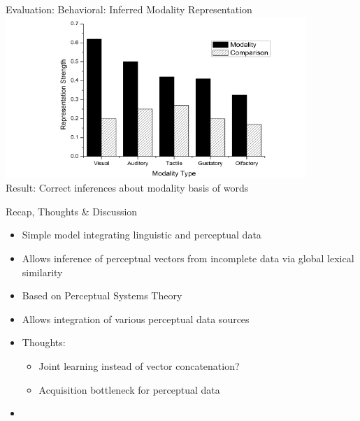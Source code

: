 \documentclass[12pt,a4paper]{beamer}
\begin{document}
\begin{frame}{Evaluation: Behavioral: Inferred Modality Representation}
\includegraphics[scale=0.7]{figure_5_level_of_strength_for_different_modalities.png}
\\
Result: Correct inferences about modality basis of words
\end{frame}



\begin{frame}{Recap, Thoughts \& Discussion}
\begin{itemize}
\item Simple model integrating linguistic and perceptual data
\item Allows inference of perceptual vectors from incomplete data via global lexical similarity
\item Based on Perceptual Systems Theory
\item Allows integration of various perceptual data sources
\item Thoughts:
    \begin{itemize}
    \item Joint learning instead of vector concatenation?
    \item Acquisition bottleneck for perceptual data
    \end{itemize}
\end{itemize}
\end{frame}


\begin{frame}{}
\begin{itemize}
\item
\end{itemize}
\end{frame}
\end{document}
